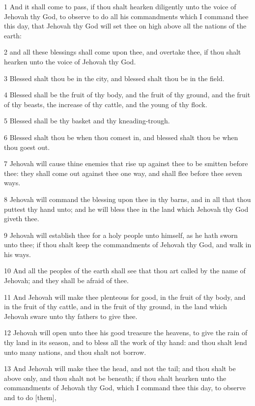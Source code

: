 \par 1 And it shall come to pass, if thou shalt hearken diligently unto the voice of Jehovah thy God, to observe to do all his commandments which I command thee this day, that Jehovah thy God will set thee on high above all the nations of the earth:
\par 2 and all these blessings shall come upon thee, and overtake thee, if thou shalt hearken unto the voice of Jehovah thy God.
\par 3 Blessed shalt thou be in the city, and blessed shalt thou be in the field.
\par 4 Blessed shall be the fruit of thy body, and the fruit of thy ground, and the fruit of thy beasts, the increase of thy cattle, and the young of thy flock.
\par 5 Blessed shall be thy basket and thy kneading-trough.
\par 6 Blessed shalt thou be when thou comest in, and blessed shalt thou be when thou goest out.
\par 7 Jehovah will cause thine enemies that rise up against thee to be smitten before thee: they shall come out against thee one way, and shall flee before thee seven ways.
\par 8 Jehovah will command the blessing upon thee in thy barns, and in all that thou puttest thy hand unto; and he will bless thee in the land which Jehovah thy God giveth thee.
\par 9 Jehovah will establish thee for a holy people unto himself, as he hath sworn unto thee; if thou shalt keep the commandments of Jehovah thy God, and walk in his ways.
\par 10 And all the peoples of the earth shall see that thou art called by the name of Jehovah; and they shall be afraid of thee.
\par 11 And Jehovah will make thee plenteous for good, in the fruit of thy body, and in the fruit of thy cattle, and in the fruit of thy ground, in the land which Jehovah sware unto thy fathers to give thee.
\par 12 Jehovah will open unto thee his good treasure the heavens, to give the rain of thy land in its season, and to bless all the work of thy hand: and thou shalt lend unto many nations, and thou shalt not borrow.
\par 13 And Jehovah will make thee the head, and not the tail; and thou shalt be above only, and thou shalt not be beneath; if thou shalt hearken unto the commandments of Jehovah thy God, which I command thee this day, to observe and to do [them],

